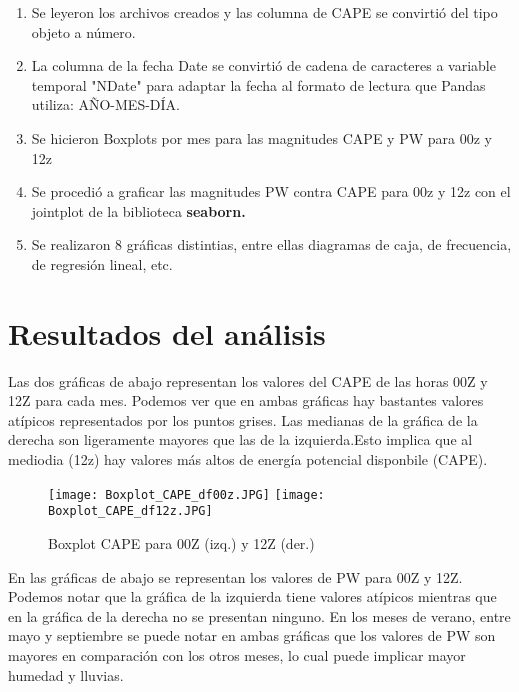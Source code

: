 \documentclass[a4paper]{article}
\begin{document}
\begin{enumerate}
\item Se leyeron los archivos creados y las columna de CAPE se convirtió del tipo objeto a número.

\item La columna de la fecha Date se convirtió de cadena de caracteres a variable temporal "NDate" para adaptar la fecha al formato de lectura que Pandas utiliza: AÑO-MES-DÍA.

\item Se hicieron Boxplots por mes para las magnitudes CAPE y PW para 00z y 12z

\item Se procedió a graficar las magnitudes PW contra CAPE para 00z y 12z con el jointplot de la biblioteca \textbf{seaborn.}



\item Se realizaron 8 gráficas distintias, entre ellas diagramas de caja, de frecuencia, de regresión lineal, etc.

\end{enumerate}

\section{Resultados del análisis}

Las dos gráficas de abajo representan los valores del CAPE de las horas 00Z y 12Z para cada mes.
Podemos ver que en ambas gráficas hay bastantes valores atípicos representados por los puntos grises.
Las medianas de la gráfica de la derecha son ligeramente mayores que las de la izquierda.Esto implica que al mediodia (12z) hay valores más altos de energía potencial disponbile (CAPE).


\begin{figure}[h!]
\centering 
\texttt{[image: Boxplot\_CAPE\_df00z.JPG]}
\label{fig:00Z}
\texttt{[image: Boxplot\_CAPE\_df12z.JPG]}
\label{fig:12Z}   
\caption{Boxplot CAPE para 00Z (izq.) y 12Z (der.)}
\end{figure}



En las gráficas de abajo se representan los valores de PW para 00Z y 12Z. Podemos notar que la gráfica de la izquierda tiene valores atípicos mientras que en la gráfica de la derecha no se presentan ninguno. En los meses de verano, entre mayo y septiembre se puede notar en ambas gráficas que los valores de PW son mayores en comparación con los otros meses, lo cual puede implicar mayor humedad y lluvias.
\end{document}
